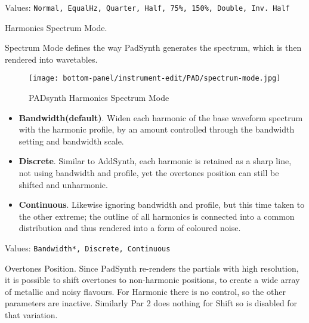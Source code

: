    Values: \texttt{Normal, EqualHz, Quarter, Half, 75\%, 150\%, Double, Inv.  Half}

   Harmonics Spectrum Mode.

   Spectrum Mode defines the way PadSynth generates the spectrum, which is then
   rendered into wavetables.

\begin{figure}[H]
   \centering
   \texttt{[image: bottom-panel/instrument-edit/PAD/spectrum-mode.jpg]}
   \caption{PADsynth Harmonics Spectrum Mode}
   \label{fig:padsynth_harmonics_spectrum mode}
\end{figure}

   \begin{itemize}
      \item \textbf{Bandwidth(default)}.
         Widen each harmonic of the base waveform spectrum with the harmonic
         profile, by an amount controlled through the bandwidth setting and
         bandwidth scale.
      \item \textbf{Discrete}.
         Similar to AddSynth, each harmonic is retained as a sharp line, not using
         bandwidth and profile, yet the overtones position can still be shifted
         and unharmonic.
      \item \textbf{Continuous}.
         Likewise ignoring bandwidth and profile, but this time taken to the other
         extreme; the outline of all harmonics is connected into a common
         distribution and thus rendered into a form of coloured noise.
   \end{itemize}

   Values: \texttt{Bandwidth*, Discrete, Continuous}

   Overtones Position.
   Since PadSynth re-renders the partials with high resolution, it is possible to
   shift overtones to non-harmonic positions, to create a wide array of metallic
   and noisy flavours. For Harmonic there is no control, so the other parameters
   are inactive. Similarly Par 2 does nothing for Shift so is disabled for that
   variation.

